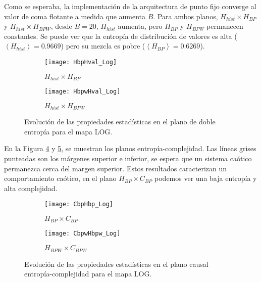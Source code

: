 Como se esperaba, la implementación de la arquitectura de punto fijo converge al valor de coma flotante a medida que aumenta $B$.
Para ambos planos, $H_{hist} \times H_{BP}$ y $H_{hist} \times H_{BPW}$, desde $B = 20$, $H_{hist}$ aumenta, pero $H_{BP}$ y $H_{BPW}$ permanecen constantes.
Se puede ver que la entropía de distribución de valores es alta ($\left \langle H_{hist} \right \rangle = 0.9669$) pero su mezcla es pobre ($\left \langle H_{BP} \right \rangle = 0.6269$).
%
\begin{figure}[htpb]
	\centering
	\begin{subfigure}[b]{0.49\textwidth}
		\texttt{[image: HbpHval\_Log]}
		\caption{$H_{hist} \times H_{BP}$}
		\label{fig:HbpHval_Log}
	\end{subfigure}
	\begin{subfigure}[b]{0.49\textwidth}
		\texttt{[image: HbpwHval\_Log]}
		\caption{$H_{hist} \times H_{BPW}$}
		\label{fig:HbpwHval_Log}
	\end{subfigure}
	\caption{Evolución de las propiedades estadísticas en el plano de doble entropía para el mapa LOG.}
	\label{fig:LOG_HH}
\end{figure}

En la Figura \ref{fig:CbpHbp_Log} y \ref{fig:CbpwHbpw_Log}, se muestran los planos entropía-complejidad.
Las líneas grises punteadas son los márgenes superior e inferior, se espera que un sistema caótico permanezca cerca del margen superior.
Estos resultados caracterizan un comportamiento caótico, en el plano $H_{BP} \times C_{BP}$ podemos ver una baja entropía y alta complejidad.
%
\begin{figure}[htpb]
	\centering
	\begin{subfigure}[b]{0.49\textwidth}
		\texttt{[image: CbpHbp\_Log]}
		\caption{$H_{BP} \times C_{BP}$}
		\label{fig:CbpHbp_Log}
	\end{subfigure}
	\begin{subfigure}[b]{0.49\textwidth}
		\texttt{[image: CbpwHbpw\_Log]}
		\caption{$H_{BPW} \times C_{BPW}$}
		\label{fig:CbpwHbpw_Log}
	\end{subfigure}
	\caption{Evolución de las propiedades estadísticas en el plano causal entropía-complejidad para el mapa LOG.}
	\label{fig:LOG_HC}
\end{figure}
